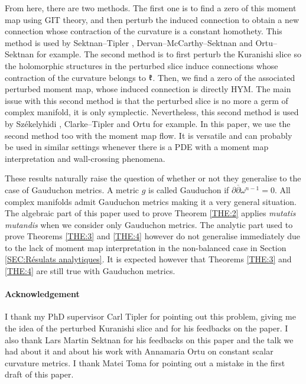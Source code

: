 \documentclass{article}
\theoremstyle{remark}
\theoremstyle{definition}
\newcommand{\dbar}{\overline{\partial}}
\begin{document}
From here, there are two methods. The first one is to find a zero of this moment map using GIT theory, and then perturb the induced connection to obtain a new connection whose contraction of the curvature is a constant homothety. This method is used by Sektnan--Tipler \cite{Sektnan_Tipler}, Dervan--McCarthy--Sektnan \cite{DMS} and Ortu--Sektnan \cite{Ortu_Sektnan} for example. The second method is to first perturb the Kuranishi slice so the holomorphic structures in the perturbed slice induce connections whose contraction of the curvature belongs to $\frak{k}$. Then, we find a zero of the associated perturbed moment map, whose induced connection is directly HYM. The main issue with this second method is that the perturbed slice is no more a germ of complex manifold, it is only symplectic. Nevertheless, this second method is used by Székelyhidi \cite{Gabor}, Clarke--Tipler \cite{Clarke_Tipler} and Ortu \cite{Ortu} for example. In this paper, we use the second method too with the moment map flow. It is versatile and can probably be used in similar settings whenever there is a PDE with a moment map interpretation and wall-crossing phenomena.

These results naturally raise the question of whether or not they generalise to the case of Gauduchon metrics. A metric $g$ is called Gauduchon if $\partial\dbar\omega^{n - 1} = 0$. All complex manifolds admit Gauduchon metrics making it a very general situation. The algebraic part of this paper used to prove Theorem \ref{THE:2} applies \textit{mutatis mutandis} when we consider only Gauduchon metrics. The analytic part used to prove Theorems \ref{THE:3} and \ref{THE:4} however do not generalise immediately due to the lack of moment map interpretation in the non-balanced case in Section \ref{SEC:Résulats analytiques}. It is expected however that Theorems \ref{THE:3} and \ref{THE:4} are still true with Gauduchon metrics.

\paragraph{Acknowledgement}

I thank my PhD supervisor Carl Tipler for pointing out this problem, giving me the idea of the perturbed Kuranishi slice and for his feedbacks on the paper. I also thank Lars Martin Sektnan for his feedbacks on this paper and the talk we had about it and about his work with Annamaria Ortu on constant scalar curvature metrics. I thank Matei Toma for pointing out a mistake in the first draft of this paper.
\end{document}
